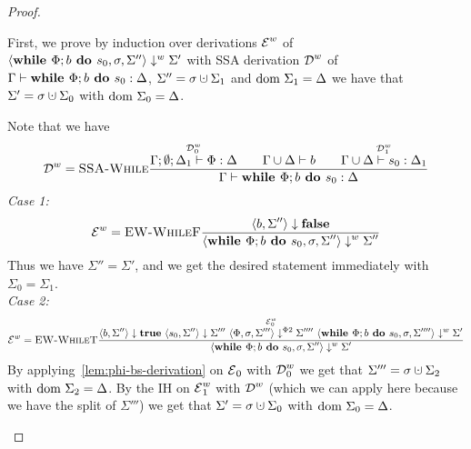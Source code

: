 \begin{proof}
\begin{landscape}
        \begin{claim}
            First, we prove by induction over derivations $\operatorname{\mathcal{E}}^w$ of 
            $\langle \textbf{while }\Phi;{b} \textbf{ do } {s_0}, \sigma, \Sigma'' \rangle \downarrow^w \Sigma'$
            with SSA derivation $\operatorname{\mathcal{D}}^w$ of $\Gamma \vdash {\textbf{while }\Phi;{b} \textbf{ do } {s_0}}: \Delta$,
            $\Sigma'' = \store \dunion \Sigma_1$ and $\text{dom }{\Sigma_1} = \Delta$
            we have that $\Sigma' = \store \dunion \Sigma_0$ with $\text{dom }{\Sigma_0} = \Delta$.
        \end{claim}
        \begin{claimproof}
            Note that we have
            \begin{align*}
                \operatorname{\mathcal{D}}^w = \textsc{SSA-While}\frac{\displaystyle \overset{\operatorname{\mathcal{D}}^w_0}{\Gamma;\emptyset;\Delta_1 \vdash {\Phi}: \Delta}\qquad
                \Gamma \cup \Delta \vdash {b}\qquad
                \overset{\operatorname{\mathcal{D}}^w_1}{\Gamma \cup \Delta \vdash {s_0}: \Delta_1}}{\displaystyle \Gamma \vdash {\textbf{while }\Phi;{b} \textbf{ do } {s_0}}: \Delta}
            \end{align*}
            \emph{Case 1:}
            \begin{align*}
                \operatorname{\mathcal{E}}^w = \textsc{EW-WhileF}\frac{\displaystyle \langle b, \Sigma'' \rangle \downarrow \textbf{false}}{\displaystyle \langle \textbf{while }\Phi;{b} \textbf{ do } {s_0}, \sigma, \Sigma'' \rangle \downarrow^w \Sigma''}
            \end{align*}
            Thus we have $\Sigma'' = \Sigma'$, and we get the desired statement immediately with $\Sigma_0 = \Sigma_1$.\\
            \emph{Case 2:}
            \begin{align*}
                \E^w = \bsrule{EW-WhileT}{\bigstep{b}{\Sigma''}{\btrue} \  
                \bigstep{s_0}{\Sigma''}{\Sigma'''} \  
                \overset{\E^w_0}{\bigsteppr{\philist}{\store}{\Sigma'''}{\Sigma''''}} \ 
                \bigstepw{\defaultssawhile}{\store}{\Sigma''''}{\Sigma'}}
                {\bigstepw{\defaultssawhile}{\store}{\Sigma''}{\Sigma'}}
            \end{align*}
            By applying~\autoref{lem:phi-bs-derivation} on $\operatorname{\mathcal{E}}_0$ with $\operatorname{\mathcal{D}}^w_0$ we get that
            $\Sigma''' = \sigma \dunion \Sigma_2$ with $\text{dom }{\Sigma_2} = \Delta$.
            By the IH on $\operatorname{\mathcal{E}}^w_1$ with $\operatorname{\mathcal{D}}^w$ (which we can apply here because we have the split of $\Sigma'''$)
            we get that $\Sigma' = \sigma \dunion \Sigma_0$ with $\text{dom }{\Sigma_0} = \Delta$.
        \end{claimproof}
    

\end{landscape}
\end{proof}
